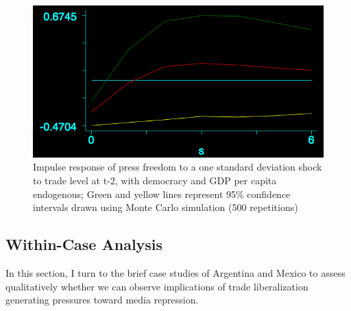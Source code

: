 \documentclass[12pt]{report}
\begin{document}
\begin{centering}
\begin{figure}
\includegraphics[scale=0.5]{article2_var_trade.png}
\caption{Impulse response of press freedom to a one standard deviation shock to trade level at t-2,
with democracy and GDP per capita endogenous; Green and yellow lines represent 95\% confidence
intervals drawn using Monte Carlo simulation (500 repetitions)}
\end{figure}
\end{centering}

\subsection{Within-Case Analysis}

In this section, I turn to the brief case studies of Argentina and Mexico to assess qualitatively
whether we can observe implications of trade liberalization generating pressures toward media
repression.
\end{document}
